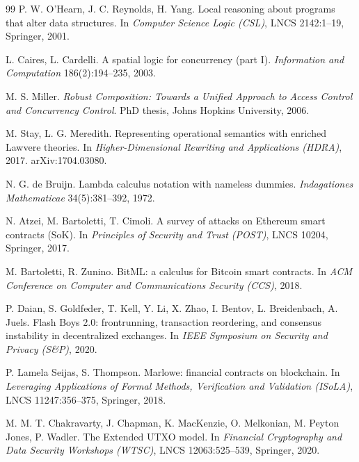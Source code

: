 \documentclass[11pt]{article}
\theoremstyle{definition}
\theoremstyle{plain}
\begin{document}
\begin{thebibliography}{99}
P. W. O'Hearn, J. C. Reynolds, H. Yang.
\newblock Local reasoning about programs that alter data structures.
\newblock In \emph{Computer Science Logic (CSL)}, LNCS 2142:1--19, Springer, 2001.

L. Caires, L. Cardelli.
\newblock A spatial logic for concurrency (part I).
\newblock \emph{Information and Computation} 186(2):194--235, 2003.

M. S. Miller.
\newblock \emph{Robust Composition: Towards a Unified Approach to Access Control and Concurrency
Control}.
\newblock PhD thesis, Johns Hopkins University, 2006.

M. Stay, L. G. Meredith.
\newblock Representing operational semantics with enriched Lawvere theories.
\newblock In \emph{Higher-Dimensional Rewriting and Applications (HDRA)}, 2017. arXiv:1704.03080.

N. G. de Bruijn.
\newblock Lambda calculus notation with nameless dummies.
\newblock \emph{Indagationes Mathematicae} 34(5):381--392, 1972.

N. Atzei, M. Bartoletti, T. Cimoli.
\newblock A survey of attacks on Ethereum smart contracts (SoK).
\newblock In \emph{Principles of Security and Trust (POST)}, LNCS 10204, Springer, 2017.

M. Bartoletti, R. Zunino.
\newblock BitML: a calculus for Bitcoin smart contracts.
\newblock In \emph{ACM Conference on Computer and Communications Security (CCS)}, 2018.

P. Daian, S. Goldfeder, T. Kell, Y. Li, X. Zhao, I. Bentov, L. Breidenbach, A. Juels.
\newblock Flash Boys 2.0: frontrunning, transaction reordering, and consensus instability in
decentralized exchanges.
\newblock In \emph{IEEE Symposium on Security and Privacy (S\&P)}, 2020.

P. Lamela Seijas, S. Thompson.
\newblock Marlowe: financial contracts on blockchain.
\newblock In \emph{Leveraging Applications of Formal Methods, Verification and Validation (ISoLA)},
LNCS 11247:356--375, Springer, 2018.

M. M. T. Chakravarty, J. Chapman, K. MacKenzie, O. Melkonian, M. Peyton Jones, P. Wadler.
\newblock The Extended UTXO model.
\newblock In \emph{Financial Cryptography and Data Security Workshops (WTSC)}, LNCS 12063:525--539,
Springer, 2020.


\end{thebibliography}
\end{document}
